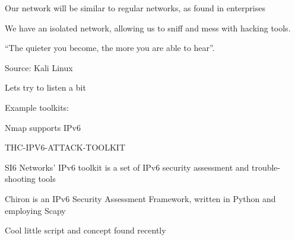 \documentclass[Screen16to9,17pt]{foils}
\begin{document}




\begin{list1}
\item Our network will be similar to regular networks, as found in enterprises
\item We have an isolated network, allowing us to sniff and mess with hacking tools.
\end{list1}




\centerline{“The quieter you become, the more you are able to hear”.}
Source: Kali Linux

\begin{list2}
\item Lets try to listen a bit
\end{list2}




\begin{quote}

\end{quote}

Example toolkits:
\begin{list2}
\item Nmap supports IPv6 
\item THC-IPV6-ATTACK-TOOLKIT \\
\item SI6 Networks’ IPv6 toolkit is a set of IPv6 security assessment and trouble-shooting tools\\

\item Chiron is an IPv6 Security Assessment Framework, written in Python and employing Scapy\\

\item Cool little script and concept found recently 
\end{list2}
\end{document}
